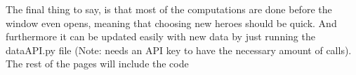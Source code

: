\documentclass{article}
\begin{document}
The final thing to say, is that most of the computations are done before the window even opens, meaning that choosing new heroes should be quick. And furthermore it can be updated easily with new data by just running the dataAPI.py file (Note: needs an API key to have the necessary amount of calls). The rest of the pages will include the code
\end{document}
